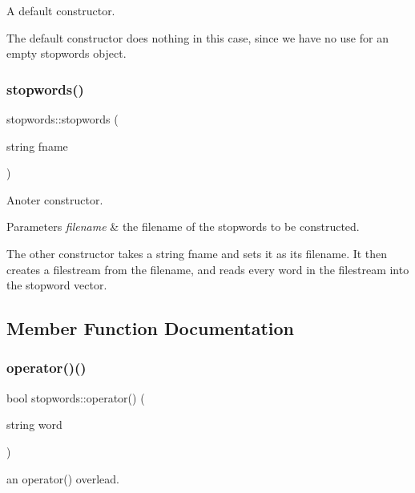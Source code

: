 A default constructor. 

The default constructor does nothing in this case, since we have no use for an empty stopwords object. \mbox{\label{classstopwords_a726865f116a88b84c2239e80a1fb872a}} 
\subsubsection{\texorpdfstring{stopwords()}{stopwords()}\hspace{0.1cm}{\footnotesize\ttfamily [2/2]}}
{\footnotesize\ttfamily stopwords\+::stopwords (\begin{DoxyParamCaption}\item[{string}]{fname }\end{DoxyParamCaption})}



Anoter constructor. 


\begin{DoxyParams}{Parameters}
{\em filename} & the filename of the stopwords to be constructed.\\
\hline
\end{DoxyParams}
The other constructor takes a string fname and sets it as its filename. It then creates a filestream from the filename, and reads every word in the filestream into the stopword vector. 

\subsection{Member Function Documentation}
\mbox{\label{classstopwords_a7e237ef49803d27b80d5efcca17f53b3}} 
\subsubsection{\texorpdfstring{operator()()}{operator()()}}
{\footnotesize\ttfamily bool stopwords\+::operator() (\begin{DoxyParamCaption}\item[{string}]{word }\end{DoxyParamCaption})}



an operator() overlead. 


